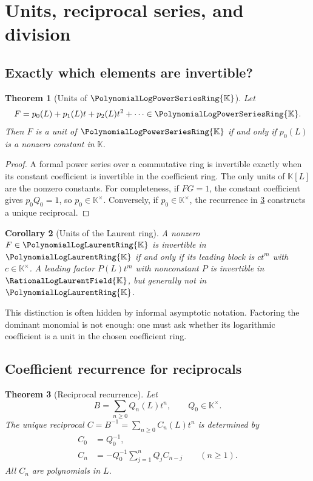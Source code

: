 \documentclass[11pt]{article}
\theoremstyle{pltheorem}
\newtheorem{theorem}{Theorem}[section]
\newtheorem{corollary}[theorem]{Corollary}
\newcommand{\K}{\mathbb K}
\newcommand{\PL}{\PolynomialLogPowerSeriesRing{\K}}
\newcommand{\PLL}{\PolynomialLogLaurentRing{\K}}
\newcommand{\QPL}{\RationalLogLaurentField{\K}}
\begin{document}
\section{Units, reciprocal series, and division}
\label{sec:division}

\subsection{Exactly which elements are invertible?}

\begin{theorem}[Units of \(\PL\)]\label{thm:units-P}
Let
\[
 F=p_0(L)+p_1(L)t+p_2(L)t^2+\cdots\in\PL.
\]
Then \(F\) is a unit of \(\PL\) if and only if \(p_0(L)\) is a nonzero constant in \(\K\).
\end{theorem}

\begin{proof}
A formal power series over a commutative ring is invertible exactly when its constant coefficient is invertible in the coefficient ring.  The only units of \(\K[L]\) are the nonzero constants.  For completeness, if \(FG=1\), the constant coefficient gives \(p_0Q_0=1\), so \(p_0\in\K^\times\).  Conversely, if \(p_0\in\K^\times\), the recurrence in \cref{thm:reciprocal-recurrence} constructs a unique reciprocal.
\end{proof}

\begin{corollary}[Units of the Laurent ring]\label{cor:units-Laurent}
A nonzero \(F\in\PLL\) is invertible in \(\PLL\) if and only if its leading block is
\(ct^m\) with \(c\in\K^\times\).  A leading factor \(P(L)t^m\) with nonconstant \(P\) is invertible in \(\QPL\), but generally not in \(\PLL\).
\end{corollary}

This distinction is often hidden by informal asymptotic notation.  Factoring the dominant monomial is not enough: one must ask whether its logarithmic coefficient is a unit in the chosen coefficient ring.

\subsection{Coefficient recurrence for reciprocals}

\begin{theorem}[Reciprocal recurrence]\label{thm:reciprocal-recurrence}
Let
\begin{equation}\label{eq:B-and-C}
 B=\sum_{n\ge0}Q_n(L)t^n,
 \qquad Q_0\in\K^\times.
\end{equation}
The unique reciprocal
\(C=B^{-1}=\sum_{n\ge0}C_n(L)t^n\) is determined by
\begin{align}
 C_0&=Q_0^{-1},\label{eq:reciprocal-C0}\\
 C_n&=-Q_0^{-1}\sum_{j=1}^{n}Q_jC_{n-j}
 \qquad(n\ge1).\label{eq:reciprocal-Cn}
\end{align}
All \(C_n\) are polynomials in \(L\).
\end{theorem}
\end{document}
